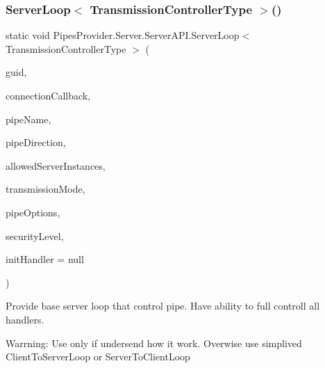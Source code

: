 \subsubsection{\texorpdfstring{Server\+Loop$<$ Transmission\+Controller\+Type $>$()}{ServerLoop< TransmissionControllerType >()}}
{\footnotesize\ttfamily static void Pipes\+Provider.\+Server.\+Server\+A\+P\+I.\+Server\+Loop$<$ Transmission\+Controller\+Type $>$ (\begin{DoxyParamCaption}\item[{string}]{guid,  }\item[{System.\+Action$<$ \mbox{\hyperlink{class_pipes_provider_1_1_server_1_1_transmission_controllers_1_1_base_server_transmission_controller}{Base\+Server\+Transmission\+Controller}} $>$}]{connection\+Callback,  }\item[{string}]{pipe\+Name,  }\item[{Pipe\+Direction}]{pipe\+Direction,  }\item[{int}]{allowed\+Server\+Instances,  }\item[{Pipe\+Transmission\+Mode}]{transmission\+Mode,  }\item[{Pipe\+Options}]{pipe\+Options,  }\item[{\mbox{\hyperlink{namespace_pipes_provider_1_1_security_a1a6020eca1c661a6f7140e8260502d7e}{Security.\+Security\+Level}}}]{security\+Level,  }\item[{System.\+Action$<$ \mbox{\hyperlink{class_pipes_provider_1_1_server_1_1_transmission_controllers_1_1_base_server_transmission_controller}{Base\+Server\+Transmission\+Controller}} $>$}]{init\+Handler = {\ttfamily null} }\end{DoxyParamCaption})\hspace{0.3cm}{\ttfamily [static]}}



Provide base server loop that control pipe. Have ability to full controll all handlers. 

Warrning\+: Use only if undersend how it work. Overwise use simplived Client\+To\+Server\+Loop or Server\+To\+Client\+Loop 



